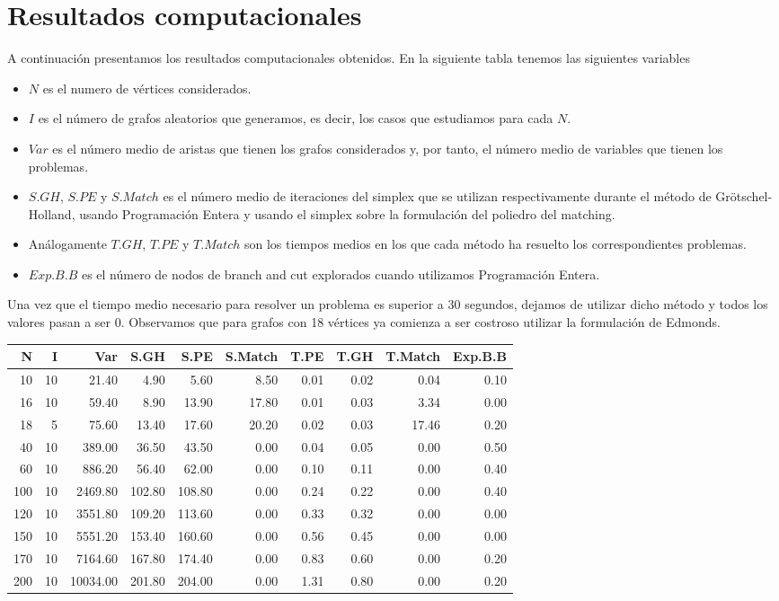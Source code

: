 \documentclass[twoside,a4paper,openright,12pt,tikz]{book}
\begin{document}
\section{Resultados computacionales}
A continuación presentamos los resultados computacionales obtenidos. En la siguiente tabla tenemos las siguientes variables 
\begin{itemize}
\item $N$ es el numero de vértices considerados.
\item $I$ es el número de grafos aleatorios que generamos, es decir, los casos que estudiamos para cada $N$.
\item $Var$ es el número medio de aristas que tienen los grafos considerados y, por tanto, el número medio de variables que tienen los problemas.
\item $S.GH$, $S.PE$ y $S.Match$ es el número medio de iteraciones del simplex que se utilizan respectivamente durante el método de Grötschel-Holland, usando Programación Entera y usando el simplex sobre la formulación del poliedro del matching.
\item Análogamente $T.GH$, $T.PE$ y $T.Match$ son los tiempos medios en los que cada método ha resuelto los correspondientes problemas.
\item $Exp.B.B$ es el número de nodos de branch and cut explorados cuando utilizamos Programación Entera.
\end{itemize} 
Una vez que el tiempo medio necesario para resolver un problema es superior a 30 segundos, dejamos de utilizar dicho método y todos los valores pasan a ser $0$. Observamos que para grafos con 18 vértices ya comienza a ser costroso utilizar la formulación de Edmonds.
\begin{table}[ht]
\centering
\begin{tabular}{rrrrrrrrrr}
  \hline
N & I & Var & S.GH & S.PE & S.Match & T.PE & T.GH & T.Match & Exp.B.B \\ 
  \hline
10 & 10 & 21.40 & 4.90 & 5.60 & 8.50 &   0.01 & 0.02 & 0.04 & 0.10 \\ 
16 & 10 & 59.40 & 8.90 & 13.90 & 17.80 & 0.01 & 0.03 & 3.34 & 0.00 \\ 
18 &  5 & 75.60 & 13.40 & 17.60 & 20.20& 0.02 & 0.03 & 17.46 & 0.20 \\ 
 \hline
40 & 10 & 389.00 & 36.50& 43.50 & 0.00 & 0.04 & 0.05 & 0.00 & 0.50 \\ 
60 & 10 & 886.20 & 56.40& 62.00 & 0.00 & 0.10 & 0.11 & 0.00 & 0.40 \\ 
100 & 10 & 2469.80 & 102.80 & 108.80 & 0.00 & 0.24 & 0.22 & 0.00 & 0.40 \\ 
120 &   10 & 3551.80 & 109.20 & 113.60 & 0.00 & 0.33 & 0.32 & 0.00 & 0.00 \\ 
150 &   10 & 5551.20 & 153.40 & 160.60 & 0.00 & 0.56 & 0.45 & 0.00 & 0.00 \\ 
170 &   10 & 7164.60 & 167.80 & 174.40 & 0.00 & 0.83 & 0.60 & 0.00 & 0.20 \\ 
200 &   10 & 10034.00 & 201.80 & 204.00 & 0.00 & 1.31 & 0.80 & 0.00 & 0.20 \\ 
  \hline
 \end{tabular}
 \end{table}
\end{document}
